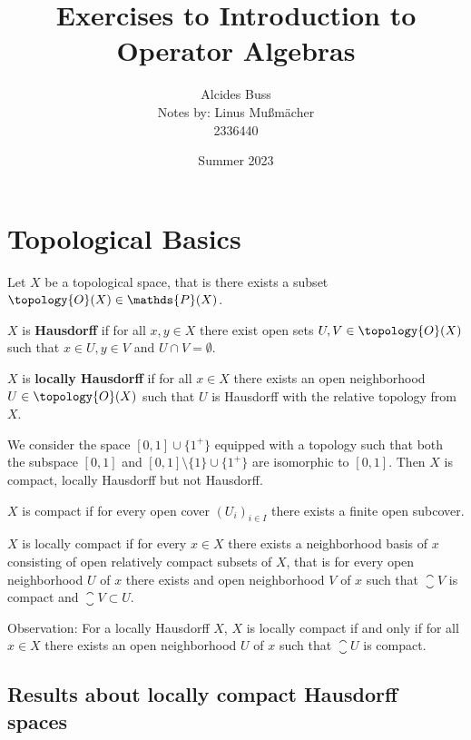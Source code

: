 \documentclass[a4paper]{article}
\title{Exercises to Introduction to Operator Algebras}
\author{Alcides Buss\\Notes by: Linus Mußmächer\\2336440}
\date{Summer 2023}
\begin{document}
\maketitle


\tableofcontents

\newpage

\section{Topological Basics}

Let $X$ be a topological space, that is there exists a subset $\topology{O}(X) \in \mathds{P}(X)$. 

\begin{definition}
	$X$ is \textbf{Hausdorff} if for all $x,y \in X$ there exist open sets $U,V \in \topology{O}(X)$ such that $x \in U, y \in V$ and $U \cap V = \emptyset$.

	$X$ is \textbf{locally Hausdorff} if for all $x \in X$ there exists an open neighborhood $U \in \topology{O}(X)$ such that $U$ is Hausdorff with the relative topology from $X$.
\end{definition}

\begin{example}
	We consider the space $[0,1] \cup \{1^+\}$ equipped with a topology such that both the subspace $[0,1]$ and $[0,1] \setminus \{1\} \cup \{1^+\}$ are isomorphic to $[0,1]$. Then $X$ is compact, locally Hausdorff but not Hausdorff.
\end{example}

\begin{definition}
	$X$ is compact if for every open cover $(U_i)_{i \in I}$ there exists a finite open subcover.

	$X$ is locally compact if for every $x \in X$ there exists a neighborhood basis of $x$ consisting of open relatively compact subsets of $X$, that is for every open neighborhood $U$ of $x$ there exists and open neighborhood $V$ of $x$ such that $\closure{V}$ is compact and $\closure{V} \subset U$.
\end{definition}

Observation: For a locally Hausdorff $X$, $X$ is locally compact if and only if for all $x \in X$ there exists an open neighborhood $U$  of $x$ such that $\closure{U}$ is compact.

\subsection{Results about locally compact Hausdorff spaces}
\end{document}
